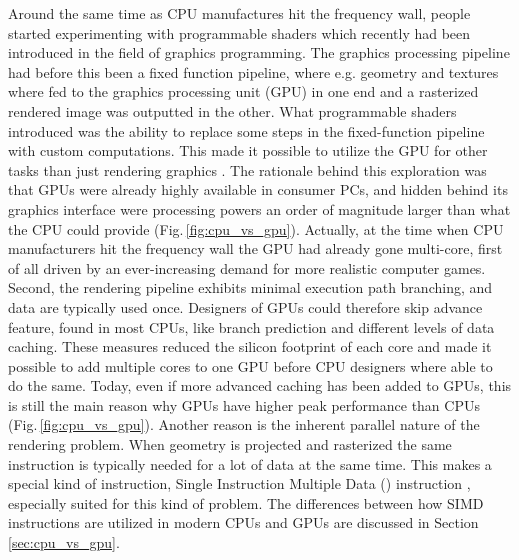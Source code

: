 Around the same time as CPU manufactures hit the frequency wall, people started experimenting with programmable shaders which recently had been introduced in the field of graphics programming. The graphics processing pipeline had before this been a fixed function pipeline, where e.g. geometry and textures where fed to the graphics processing unit (GPU) in one end and a rasterized rendered image was outputted in the other. What programmable shaders  introduced was the ability to replace some steps in the fixed-function pipeline with custom computations. This made it possible to utilize the GPU for other tasks than just rendering graphics \cite{Seland2007}. The rationale behind this exploration was that GPUs were already highly available in consumer PCs, and hidden behind its graphics interface were processing powers an order of magnitude larger than what the CPU could provide (Fig.\,\ref{fig:cpu_vs_gpu}). Actually, at the time when CPU manufacturers hit the frequency wall the GPU had already gone multi-core, first of all driven by an ever-increasing demand for more realistic computer games. Second, the rendering pipeline exhibits minimal execution path branching, and data are typically used once. Designers of GPUs could therefore skip advance feature, found in most CPUs, like branch prediction and different levels of data caching. These measures reduced the silicon footprint of each core and made it possible to add multiple cores to one GPU before CPU designers where able to do the same. Today, even if more advanced caching has been added to GPUs, this is still the main reason why GPUs have higher peak performance than CPUs (Fig.\,\ref{fig:cpu_vs_gpu}). Another reason is the inherent parallel nature of the rendering problem. When geometry is projected and rasterized the same instruction is typically needed for a lot of data at the same time. This makes a special kind of instruction, Single Instruction Multiple Data () instruction \cite{Flynn1966}, especially suited for this kind of problem. The differences between how SIMD instructions are utilized in modern CPUs and GPUs are discussed in Section \ref{sec:cpu_vs_gpu}.

